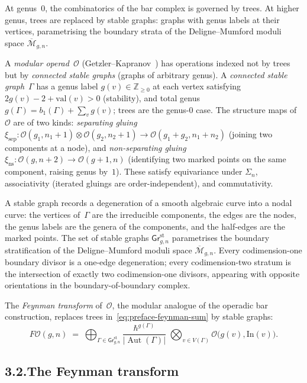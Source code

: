 \documentclass[11pt]{report}
\theoremstyle{definition}
\theoremstyle{remark}
\providecommand{\cM}{\mathcal{M}}
\providecommand{\cO}{\mathcal{O}}
\numberwithin{equation}{section}
\begin{document}
At genus~$0$, the combinatorics of the bar complex is governed by
trees. At higher genus, trees are replaced by stable graphs: graphs
with genus labels at their vertices, parametrising the boundary
strata of the Deligne--Mumford moduli space $\overline{\cM}_{g,n}$.

A \emph{modular operad}~$\cO$
(Getzler--Kapranov~\cite{GeK98}) has operations indexed
not by trees but by \emph{connected stable graphs} (graphs
of arbitrary genus). A \emph{connected stable
graph}~$\Gamma$ has a genus label
$g(v)\in\mathbb Z_{\ge 0}$ at each vertex satisfying
$2g(v)-2+\mathrm{val}(v)>0$ (stability), and total genus
$g(\Gamma)=b_1(\Gamma)+\sum_v g(v)$; trees are the
genus-$0$ case.
The structure maps of~$\cO$ are of two kinds:
\emph{separating gluing}
$\xi_{\mathrm{sep}} \colon
\cO(g_1, n_1{+}1) \otimes \cO(g_2, n_2{+}1)
\to \cO(g_1{+}g_2, n_1{+}n_2)$
(joining two components at a node), and
\emph{non-separating gluing}
$\xi_{\mathrm{ns}} \colon \cO(g, n{+}2)
\to \cO(g{+}1, n)$
(identifying two marked points on the same component,
raising genus by~$1$).
These satisfy equivariance under $\Sigma_n$,
associativity (iterated gluings are order-independent),
and commutativity.

A stable graph records a degeneration of a smooth
algebraic curve into a nodal curve: the
vertices of~$\Gamma$ are the irreducible components, the edges are
the nodes, the genus labels are the genera of the components, and
the half-edges are the marked points. The set of stable graphs
$\mathsf{Gr}^{\mathrm{st}}_{g,n}$ parametrises the boundary
stratification of the Deligne--Mumford moduli space
$\overline{\cM}_{g,n}$. Every codimension-one boundary divisor is
a one-edge degeneration; every codimension-two stratum is the
intersection of exactly two codimension-one divisors, appearing
with opposite orientations in the boundary-of-boundary complex.

The \emph{Feynman transform} of~$\cO$, the modular analogue of
the operadic bar construction, replaces trees
in~\eqref{eq:preface-feynman-sum} by stable graphs:
\begin{equation}\label{eq:preface-feynman-sum}
F\cO(g,n)
\;=\;
\bigoplus_{\Gamma\in\mathsf{Gr}^{\mathrm{st}}_{g,n}}
\frac{\hbar^{g(\Gamma)}}{|\operatorname{Aut}(\Gamma)|}
\;\bigotimes_{v\in V(\Gamma)}\cO\bigl(g(v),\mathrm{In}(v)\bigr).
\end{equation}

\subsection*{3.2.\enspace The Feynman transform}
\end{document}
